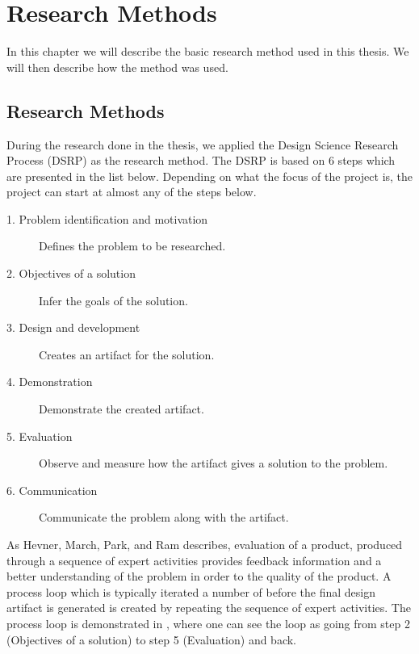 
\chapter{Research Methods} %
\label{cha:research_questions_and_method}
In this chapter we will describe the basic research method used in this 
thesis. We will then describe how the method was used.
\section{Research Methods} %
\label{sec:research_method}

During the research done in the thesis, we applied the Design Science Research 
Process (DSRP) as the research method. The DSRP is based on 6 steps which are 
presented in the list below. Depending on what the focus of the project is, 
the project can start at almost any of the steps below. \cite{peffers2006design}

\begin{description}
	\item [1. Problem identification and motivation] Defines the problem to be
	researched. 
	\item [2. Objectives of a solution] Infer the goals of the solution.
	\item [3. Design and development] Creates an artifact for the solution.
	\item [4. Demonstration] Demonstrate the created artifact.
	\item [5. Evaluation] Observe and measure how the artifact gives a 
	solution to the problem.
	\item [6. Communication] Communicate the problem along with the artifact.
\end{description}

As Hevner, March, Park, and Ram \cite{von2004design} describes, 
evaluation of a product, produced through a sequence of expert activities 
provides feedback information and a better understanding of the problem in 
order to the quality of the product. A process loop which is typically 
iterated a number of before the final design artifact is generated is created 
by repeating the sequence of expert activities. The process loop is 
demonstrated in , where one can see the loop as going 
from step 2 (Objectives of a solution) to step 5 (Evaluation) and back.\\

